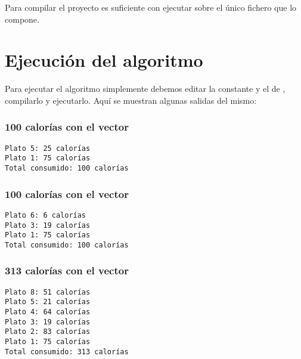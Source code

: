 Para compilar el proyecto es suficiente con ejecutar  sobre el único fichero  que lo compone.

\section{Ejecución del algoritmo}

Para ejecutar el algoritmo simplemente debemos editar la constante  y el  de , compilarlo y ejecutarlo.
Aquí se muestran algunas salidas del mismo:

\subsubsection{$\boldsymbol{100}$ calorías con el vector }

\begin{lstlisting}
Plato 5: 25 calorías
Plato 1: 75 calorías
Total consumido: 100 calorías
\end{lstlisting}

\subsubsection{$\boldsymbol{100}$ calorías con el vector }

\begin{lstlisting}
Plato 6: 6 calorías
Plato 3: 19 calorías
Plato 1: 75 calorías
Total consumido: 100 calorías
\end{lstlisting}

\subsubsection{$\boldsymbol{313}$ calorías con el vector }

\begin{lstlisting}
Plato 8: 51 calorías
Plato 5: 21 calorías
Plato 4: 64 calorías
Plato 3: 19 calorías
Plato 2: 83 calorías
Plato 1: 75 calorías
Total consumido: 313 calorías
\end{lstlisting}
